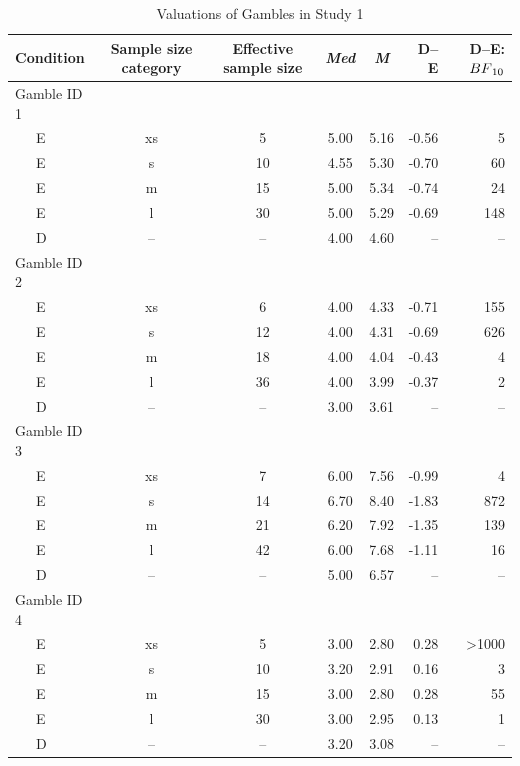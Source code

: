 \documentclass[a4paper, man, floatsintext]{apa6}
\begin{document}
\begin{table}[tbp]

\begin{center}
\begin{threeparttable}

\caption{\label{tab:means_study1}Valuations of Gambles in Study 1}

\begin{tabular}{lccccrr}
\toprule
Condition & Sample size category & Effective sample size & \textit{Med} & \textit{M} & D--E & D--E:$BF\textsubscript{10}$\\
\midrule
Gamble ID 1 &  &  &  &  &  & \\
\ \ \ E & xs & 5 & 5.00 & 5.16 & -0.56 & 5\\
\ \ \ E & s & 10 & 4.55 & 5.30 & -0.70 & 60\\
\ \ \ E & m & 15 & 5.00 & 5.34 & -0.74 & 24\\
\ \ \ E & l & 30 & 5.00 & 5.29 & -0.69 & 148\\
\ \ \ D & -- & -- & 4.00 & 4.60 & -- & --\\
Gamble ID 2 &  &  &  &  &  & \\
\ \ \ E & xs & 6 & 4.00 & 4.33 & -0.71 & 155\\
\ \ \ E & s & 12 & 4.00 & 4.31 & -0.69 & 626\\
\ \ \ E & m & 18 & 4.00 & 4.04 & -0.43 & 4\\
\ \ \ E & l & 36 & 4.00 & 3.99 & -0.37 & 2\\
\ \ \ D & -- & -- & 3.00 & 3.61 & -- & --\\
Gamble ID 3 &  &  &  &  &  & \\
\ \ \ E & xs & 7 & 6.00 & 7.56 & -0.99 & 4\\
\ \ \ E & s & 14 & 6.70 & 8.40 & -1.83 & 872\\
\ \ \ E & m & 21 & 6.20 & 7.92 & -1.35 & 139\\
\ \ \ E & l & 42 & 6.00 & 7.68 & -1.11 & 16\\
\ \ \ D & -- & -- & 5.00 & 6.57 & -- & --\\
Gamble ID 4 &  &  &  &  &  & \\
\ \ \ E & xs & 5 & 3.00 & 2.80 & 0.28 & >1000\\
\ \ \ E & s & 10 & 3.20 & 2.91 & 0.16 & 3\\
\ \ \ E & m & 15 & 3.00 & 2.80 & 0.28 & 55\\
\ \ \ E & l & 30 & 3.00 & 2.95 & 0.13 & 1\\
\ \ \ D & -- & -- & 3.20 & 3.08 & -- & --\\

\end{tabular}
\end{threeparttable}
\end{center}
\end{table}
\end{document}
